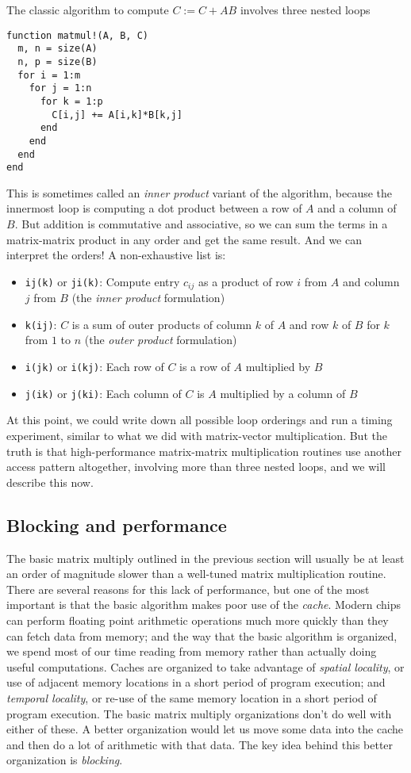 \documentclass[12pt, leqno]{article} %
\begin{document}
The classic algorithm to compute $C := C + AB$ involves
three nested loops
\begin{lstlisting}
function matmul!(A, B, C)
  m, n = size(A)
  n, p = size(B)
  for i = 1:m
    for j = 1:n
      for k = 1:p
        C[i,j] += A[i,k]*B[k,j]
      end
    end
  end
end
\end{lstlisting}
This is sometimes called an {\em inner product} variant of
the algorithm, because the innermost loop is computing a dot
product between a row of $A$ and a column of $B$.  But
addition is commutative and associative, so we can sum the
terms in a matrix-matrix product in any order and get the same
result.  And we can interpret the orders!  A non-exhaustive
list is:
\begin{itemize}
\item {\tt ij(k)} or {\tt ji(k)}: Compute entry $c_{ij}$ as a
  product of row $i$ from $A$ and column $j$ from $B$
  (the {\em inner product} formulation)
\item {\tt k(ij)}: $C$ is a sum of outer products of column $k$
  of $A$ and row $k$ of $B$ for $k$ from $1$ to $n$
  (the {\em outer product} formulation)
\item {\tt i(jk)} or {\tt i(kj)}: Each row of $C$ is a row of
  $A$ multiplied by $B$
\item {\tt j(ik)} or {\tt j(ki)}: Each column of $C$ is $A$
  multiplied by a column of $B$
\end{itemize}
At this point, we could write down all possible loop orderings
and run a timing experiment, similar to what we did with
matrix-vector multiplication.  But the truth is that high-performance
matrix-matrix multiplication routines use another access pattern
altogether, involving more than three nested loops, and we will
describe this now.

\subsection{Blocking and performance}

The basic matrix multiply outlined in the previous section will
usually be at least an order of magnitude slower than a well-tuned
matrix multiplication routine.  There are several reasons for this
lack of performance, but one of the most important is that the basic
algorithm makes poor use of the {\em cache}.
Modern chips can perform floating point arithmetic operations much
more quickly than they can fetch data from memory; and the way that
the basic algorithm is organized, we spend most of our time reading
from memory rather than actually doing useful computations.
Caches are organized to take advantage of {\em spatial locality},
or use of adjacent memory locations in a short period of program execution;
and {\em temporal locality}, or re-use of the same memory location in a
short period of program execution.  The basic matrix multiply organizations
don't do well with either of these.
A better organization would let us move some data into the cache
and then do a lot of arithmetic with that data.  The key idea behind
this better organization is {\em blocking}.
\end{document}
